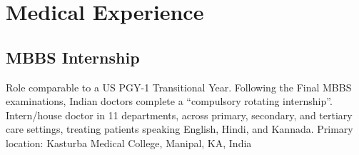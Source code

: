 \documentclass[10pt, letterpaper]{article}
\begin{document}
\section{Medical Experience}
\subsection{MBBS Internship}


\begin{minipage}[t]{1\textwidth}
Role comparable to a US PGY-1 Transitional Year. Following the Final MBBS examinations, Indian doctors complete a “compulsory rotating internship”. Intern/house doctor in 11 departments, across primary, secondary, and tertiary care settings, treating patients speaking English, Hindi, and Kannada. Primary location: Kasturba Medical College, Manipal, KA, India
\end{minipage}
\\
\\
\end{document}
